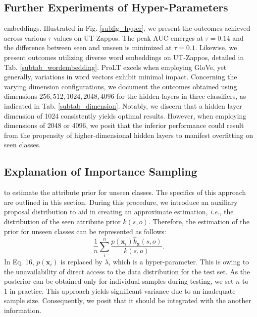 \documentclass[letterpaper]{article} %
\newcommand{\mx}{\mathbf{x}}
\newcommand{\ie}{\textit{i.e.}}
\theoremstyle{definition}
\begin{document}
\subsection{Further Experiments of Hyper-Parameters}
 embeddings. Illustrated in Fig. \ref{subfig_hyper}, we present the outcomes achieved across various $\tau$ values on UT-Zappos. The peak AUC emerges at $\tau=0.14$ and the difference between seen and unseen is minimized at $\tau=0.1$. Likewise, we present outcomes utilizing diverse word embeddings on UT-Zappos, detailed in Tab. \ref{subtab_wordembedding}. ProLT excels when employing GloVe, yet generally, variations in word vectors exhibit minimal impact. Concerning the varying dimension configurations, we document the outcomes obtained using dimensions ${256,512,1024,2048,4096}$ for the hidden layers in three classifiers, as indicated in Tab. \ref{subtab_dimension}. Notably, we discern that a hidden layer dimension of 1024 consistently yields optimal results. However, when employing dimensions of 2048 or 4096, we posit that the inferior performance could result from the propensity of higher-dimensional hidden layers to manifest overfitting on seen classes.

\subsection{Explanation of Importance Sampling}
 to estimate the attribute prior for unseen classes. The specifics of this approach are outlined in this section. During this procedure, we introduce an auxiliary proposal distribution to aid in creating an approximate estimation, \ie, the distribution of the seen attribute prior $k(s,o)$. Therefore, the estimation of the prior for unseen classes can be represented as follows:
	\begin{equation}
\frac{1}{n}\sum_{i}^{n}\frac{p(\mx_i)\hat{k}_{\mx}(s,o)}{k(s,o)}.
        \label{subeq_is}
	\end{equation}
In Eq. 16, $p(\mx_i)$ is replaced by $\lambda$, which is a hyper-parameter. This is owing to the unavailability of direct access to the data distribution for the test set. As the posterior can be obtained only for individual samples during testing, we set $n$ to 1 in practice. This approach yields significant variance due to an inadequate sample size. Consequently, we posit that it should be integrated with the another information.
\end{document}
